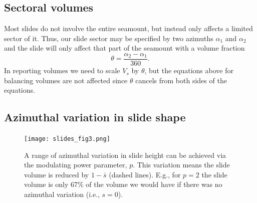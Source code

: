 \documentclass[12pt,letterpaper,margin=0.5in]{report}
\begin{document}
\subsection{Sectoral volumes}
Most slides do not involve the entire seamount, but instead only affects a limited sector of it.  Thus, our slide sector may be specified by two
azimuths $\alpha_1$ and $\alpha_2$ and the slide will only affect that part of the seamount with a volume fraction
\begin{equation}
\theta = \frac{\alpha_2 - \alpha_1}{360}.
\end{equation}
In reporting volumes we need to scale $V_s$ by $\theta$, but the equations above for balancing volumes are not affected since $\theta$ cancels from both sides of the equations.

\subsection{Azimuthal variation in slide shape}

\begin{figure}[h!]
  \centering
  \texttt{[image: slides\_fig3.png]}
  \caption{A range of azimuthal variation in slide height can be achieved via the modulating power parameter, $p$. This variation
  means the slide volume is reduced by $1 - \bar{s}$ (dashed lines). E.g., for $p = 2$ the slide volume is only 67\% of the
  volume we would have if there was no azimuthal variation (i.e., $s = 0$).}
  \label{slides_fig3}
\end{figure}
\end{document}
